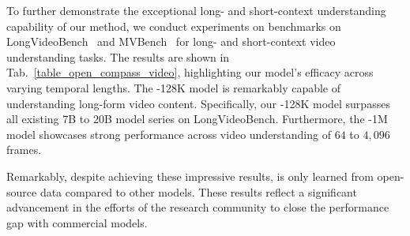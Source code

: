 %
To further demonstrate the exceptional long- and short-context understanding capability of our method, we conduct experiments on benchmarks on LongVideoBench~\cite{LongVideoBench} and MVBench~\cite{MVBench} for long- and short-context video understanding tasks.
%
The results are shown in Tab.~\ref{table_open_compass_video}, highlighting our model's efficacy across varying temporal lengths.
%
The \OurMethod-128K model is remarkably capable of understanding long-form video content.
%
Specifically, our \OurMethod-128K model surpasses all existing $7$B to $20$B model series on LongVideoBench.
%
Furthermore, the \OurMethod-1M model showcases strong performance across video understanding of $64$ to $4,096$ frames.
%


%
Remarkably, despite achieving these impressive results, \OurMethod is only learned from open-source data compared to other models.
%
These results reflect a significant advancement in the efforts of the research community to close the performance gap with commercial models.
%


